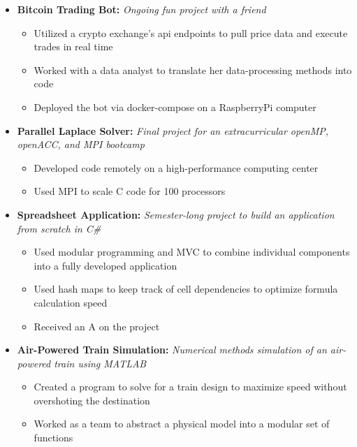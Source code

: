 \documentclass{article}
\begin{document}
\begin{itemize}
    \item \textbf{Bitcoin Trading Bot:}
        \textit{Ongoing fun project with a friend}
        \begin{itemize}
            \item Utilized a crypto exchange's api endpoints to pull price data and execute trades in real time
            \item Worked with a data analyst to translate her data-processing methods into code
            \item Deployed the bot via docker-compose on a RaspberryPi computer
        \end{itemize}
    \vspace{4mm}
    \item \textbf{Parallel Laplace Solver:} \textit{Final project for an extracurricular openMP, openACC, and MPI bootcamp}
    \begin{itemize}
        \item Developed code remotely on a high-performance computing center
        \item Used MPI to scale C code for 100 processors
    \end{itemize}
    \vspace{4mm}
    \item \textbf{Spreadsheet Application:}
    \textit{Semester-long project to build an application from scratch in C\#}
    \begin{itemize}
        \item Used modular programming and MVC to combine individual components into a fully developed application
        \item Used hash maps to keep track of cell dependencies to optimize formula calculation speed
        \item Received an A on the project
    \end{itemize}
    \vspace{4mm}
    \item \textbf{Air-Powered Train Simulation:}
         \textit{Numerical methods simulation of an air-powered train using MATLAB}
         \begin{itemize}
             \item Created a program to solve for a train design to maximize speed without overshoting the destination
             \item Worked as a team to abstract a physical model into a modular set of functions
         \end{itemize}
\end{itemize}
\end{document}
